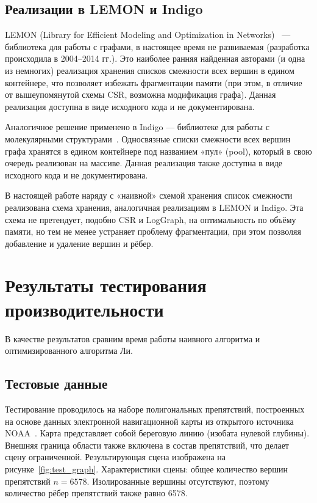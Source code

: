 \documentclass{article}
\theoremstyle{definition}
\begin{document}
\subsection{Реализации в LEMON и Indigo}

LEMON (Library for Efficient Modeling and Optimization in Networks)~\cite{LEMON}
--- библиотека для работы с графами, в настоящее время не развиваемая
(разработка происходила в 2004--2014 гг.). Это наиболее ранняя
найденная авторами (и одна из немногих) реализация хранения списков
смежности всех вершин в едином контейнере, что позволяет избежать
фрагментации памяти (при этом, в отличие от вышеупомянутой схемы CSR,
возможна модификация графа).
Данная реализация доступна в виде исходного кода и не документирована.

Аналогичное решение применено в Indigo — библиотеке для работы с
молекулярными структурами~\cite{Indigo,IndigoGithub}. Односвязные списки смежности всех вершин
графа хранятся в едином контейнере под названием «пул» (pool), который
в свою очередь реализован на массиве. Данная реализация также доступна в
виде исходного кода и не документирована.

В настоящей работе наряду с «наивной» схемой хранения список смежности
реализована схема хранения, аналогичная реализациям в LEMON и Indigo.
Эта схема не претендует, подобно CSR и LogGraph, на оптимальность
по объёму памяти, но тем не менее устраняет проблему фрагментации,
при этом позволяя добавление и удаление вершин и рёбер.

\section{Результаты тестирования производительности}

В качестве результатов сравним время работы наивного алгоритма и оптимизированного алгоритма Ли.

\subsection{Тестовые данные}

Тестирование проводилось на наборе полигональных препятствий, построенных на основе данных 
электронной навигационной карты из открытого источника NOAA~\cite{NOAA}. Карта представляет собой береговую
линию (изобата нулевой глубины). Внешняя граница области также включена в состав препятствий, 
что делает сцену ограниченной. Результирующая сцена изображена на рисунке~\ref{fig:test_graph}.
Характеристики сцены: общее количество вершин препятствий $n = 6578$. Изолированные вершины отсутствуют, поэтому количество рёбер 
препятствий также равно 6578.
\end{document}
